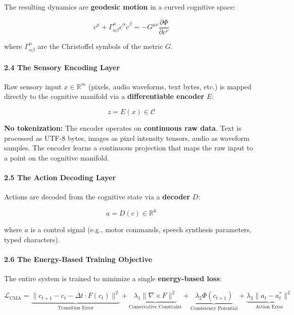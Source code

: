 \documentclass[
  11pt,
  a4paper,
]{article}
\begin{document}
The resulting dynamics are \textbf{geodesic motion} in a curved
cognitive space:

\[\ddot{c}^\mu + \Gamma^\mu_{\alpha\beta} \dot{c}^\alpha \dot{c}^\beta = -G^{\mu\nu} \frac{\partial \Phi}{\partial c^\nu}\]

where \(\Gamma^\mu_{\alpha\beta}\) are the Christoffel symbols of the
metric \(G\).

\paragraph{2.4 The Sensory Encoding
Layer}\label{the-sensory-encoding-layer}

Raw sensory input \(x \in \mathbb{R}^m\) (pixels, audio waveforms, text
bytes, etc.) is mapped directly to the cognitive manifold via a
\textbf{differentiable encoder} \(E\):

\[z = E(x) \in \mathcal{C}\]

\textbf{No tokenization:} The encoder operates on \textbf{continuous raw
data}. Text is processed as UTF-8 bytes, images as pixel intensity
tensors, audio as waveform samples. The encoder learns a continuous
projection that maps the raw input to a point on the cognitive manifold.

\paragraph{2.5 The Action Decoding
Layer}\label{the-action-decoding-layer}

Actions are decoded from the cognitive state via a \textbf{decoder}
\(D\):

\[a = D(c) \in \mathbb{R}^k\]

where \(a\) is a control signal (e.g., motor commands, speech synthesis
parameters, typed characters).

\paragraph{2.6 The Energy-Based Training
Objective}\label{the-energy-based-training-objective}

The entire system is trained to minimize a single \textbf{energy-based
loss}:

\[\mathcal{L}_{\text{CMA}} = \underbrace{\|c_{t+1} - c_t - \Delta t \cdot F(c_t)\|^2}_{\text{Transition Error}} + \underbrace{\lambda_1 \|\nabla \times F\|^2}_{\text{Conservative Constraint}} + \underbrace{\lambda_2 \Phi(c_{t+1})}_{\text{Consistency Potential}} + \underbrace{\lambda_3 \|a_t - a_t^*\|^2}_{\text{Action Error}}\]
\end{document}
